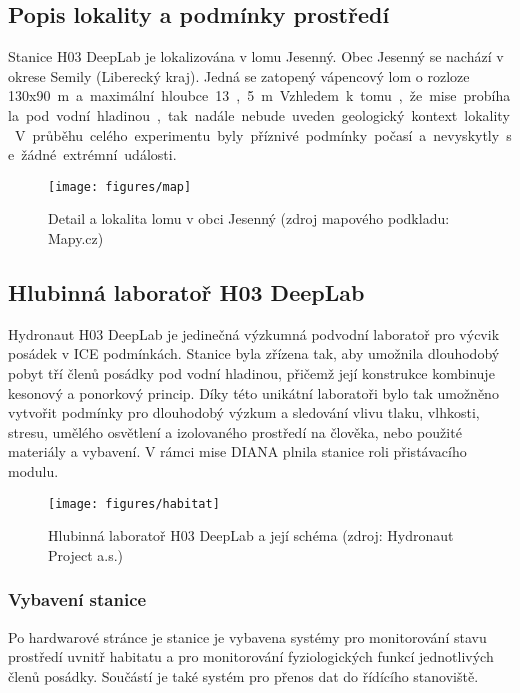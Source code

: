 \subsection{Popis lokality a podmínky prostředí}
\label{subsec:diana_lokalita}
Stanice H03 DeepLab je lokalizována v lomu Jesenný. Obec Jesenný se nachází v
okrese Semily (Liberecký kraj). Jedná se zatopený vápencový lom o rozloze
130x90~\si\meter~a maximální hloubce 13,5~\si\meter. Vzhledem k tomu, že mise
probíhala pod vodní hladinou, tak nadále nebude uveden geologický kontext
lokality. V průběhu celého experimentu byly příznivé podmínky počasí a
nevyskytly se žádné extrémní události.

\begin{figure}[h]
    \begin{center}
        \texttt{[image: figures/map]}
        \caption{Detail a lokalita lomu v obci Jesenný (zdroj mapového podkladu: Mapy.cz)}
        \label{fig:map}
    \end{center}
\end{figure}

\subsection{Hlubinná laboratoř H03 DeepLab}
\label{subsubsec:h03_deeplab}
Hydronaut H03 DeepLab je jedinečná výzkumná podvodní laboratoř pro výcvik
posádek v \gls{ICE} podmínkách. Stanice byla zřízena tak, aby umožnila
dlouhodobý pobyt tří členů posádky pod vodní hladinou, přičemž její konstrukce
kombinuje kesonový a ponorkový princip. Díky této unikátní laboratoři bylo tak
umožněno vytvořit podmínky pro dlouhodobý výzkum a sledování vlivu tlaku,
vlhkosti, stresu, umělého osvětlení a izolovaného prostředí na člověka, nebo
použité materiály a vybavení. V rámci mise DIANA plnila stanice roli
přistávacího modulu.

\begin{figure}[h]
    \begin{center}
        \texttt{[image: figures/habitat]}
        \caption{Hlubinná laboratoř H03 DeepLab a její schéma (zdroj: Hydronaut Project a.s.)}
        \label{fig:habitat}
    \end{center}
\end{figure}

\subsubsection{Vybavení stanice}
\label{subsubsec:vybaveni_stanice}
Po hardwarové stránce je stanice je vybavena systémy pro monitorování stavu
prostředí uvnitř habitatu a pro monitorování fyziologických funkcí jednotlivých
členů posádky. Součástí je také systém pro přenos dat do řídícího stanoviště.

